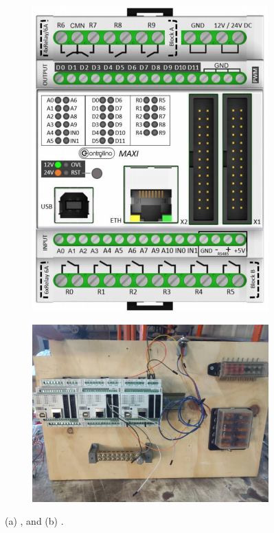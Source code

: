 \documentclass[fleqn,twoside]{article}
\begin{document}
\begin{figure}[h]
	\centering
	\begin{subfigure}{0.5\textwidth}
		\centering
		\includegraphics[width=0.95\linewidth]{controllino_1.png}
		\caption{}
		\label{fig:controllino_1}
	\end{subfigure}%
	\begin{subfigure}{0.5\textwidth}
		\centering
		\includegraphics[width=0.95\linewidth]{controllino_2.jpg}
		\caption{}
		\label{fig:controllino_2}
	\end{subfigure}%
	\caption{(a) , and (b) .}
	\label{}
\end{figure}
\end{document}
